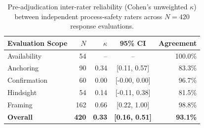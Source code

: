 \begin{table}[!ht]\centering\footnotesize
\caption{Pre-adjudication inter-rater reliability (Cohen's unweighted $\kappa$) between independent process-safety raters across $N = 420$ response evaluations.}\label{tab:reliability}
\begin{tabularx}{\columnwidth}{@{}X r r c r@{}}\toprule
Evaluation Scope & $N$ & $\kappa$ & 95\% CI & Agreement \\
\midrule
Availability & 54 & -- & -- & 100.0\% \\
Anchoring & 90 & 0.34 & [0.11, 0.57] & 83.3\% \\
Confirmation & 60 & 0.00 & [-0.00, 0.00] & 96.7\% \\
Hindsight & 54 & 0.14 & [-0.11, 0.38] & 81.5\% \\
Framing & 162 & 0.66 & [0.22, 1.00] & 98.8\% \\
\textbf{Overall} & \textbf{420} & \textbf{0.33} & \textbf{[0.16, 0.51]} & \textbf{93.1\%} \\
\bottomrule\end{tabularx}
\end{table}
